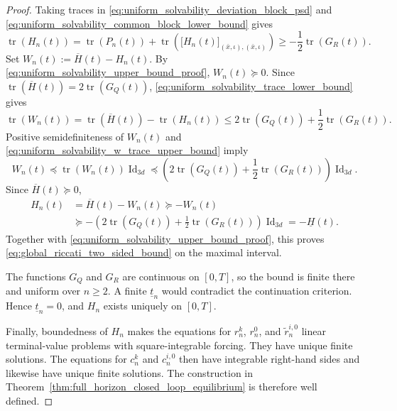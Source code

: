 \documentclass[12pt]{article}
\numberwithin{equation}{section}
\theoremstyle{definition}
\begin{document}
\begin{proof}
Taking traces in \eqref{eq:uniform_solvability_deviation_block_psd} and
\eqref{eq:uniform_solvability_common_block_lower_bound} gives
\begin{equation}\label{eq:uniform_solvability_trace_lower_bound}
\operatorname{tr}(H_n(t))
=\operatorname{tr}(P_n(t))
+\operatorname{tr}\!\left(
\bigl[H_n(t)\bigr]_{(\bar x,\iota),(\bar x,\iota)}
\right)
\geq-\frac12\operatorname{tr}(G_R(t)).
\end{equation}
Set \(W_n(t):=\overline H(t)-H_n(t)\). By
\eqref{eq:uniform_solvability_upper_bound_proof}, \(W_n(t)\succeq0\). Since
\(\operatorname{tr}(\overline H(t))=2\operatorname{tr}(G_Q(t))\),
\eqref{eq:uniform_solvability_trace_lower_bound} gives
\begin{equation}\label{eq:uniform_solvability_w_trace_upper_bound}
\operatorname{tr}(W_n(t))
=\operatorname{tr}(\overline H(t))-\operatorname{tr}(H_n(t))
\leq
2\operatorname{tr}(G_Q(t))
+\frac12\operatorname{tr}(G_R(t)).
\end{equation}
Positive semidefiniteness of \(W_n(t)\) and
\eqref{eq:uniform_solvability_w_trace_upper_bound} imply
\[
W_n(t)
\preceq\operatorname{tr}(W_n(t))\operatorname{Id}_{3d}
\preceq
\left(
2\operatorname{tr}(G_Q(t))
+\frac12\operatorname{tr}(G_R(t))
\right)\operatorname{Id}_{3d}.
\]
Since \(\overline H(t)\succeq0\),
\[
\begin{aligned}
H_n(t)
&=\overline H(t)-W_n(t)
\succeq-W_n(t)
\\
&\succeq
-\left(
2\operatorname{tr}(G_Q(t))
+\frac12\operatorname{tr}(G_R(t))
\right)\operatorname{Id}_{3d}
=-\underline H(t).
\end{aligned}
\]
Together with \eqref{eq:uniform_solvability_upper_bound_proof}, this proves
\eqref{eq:global_riccati_two_sided_bound} on the maximal interval.

The functions \(G_Q\) and \(G_R\) are continuous on \([0,T]\), so the bound
is finite there and uniform over \(n\geq2\).  A finite \(\underline t_n\)
would contradict the continuation criterion.  Hence \(\underline t_n=0\),
and \(H_n\) exists uniquely on \([0,T]\).

Finally, boundedness of \(H_n\) makes the equations for \(r_n^k\),
\(r_n^0\), and \(\widetilde r_n^{i,0}\) linear terminal-value problems
with square-integrable forcing. They have unique finite solutions. The
equations for \(c_n^k\) and \(c_n^{i,0}\) then have integrable right-hand
sides and likewise have unique finite solutions. The construction in
Theorem~\ref{thm:full_horizon_closed_loop_equilibrium} is therefore well
defined.
\end{proof}
\end{document}

